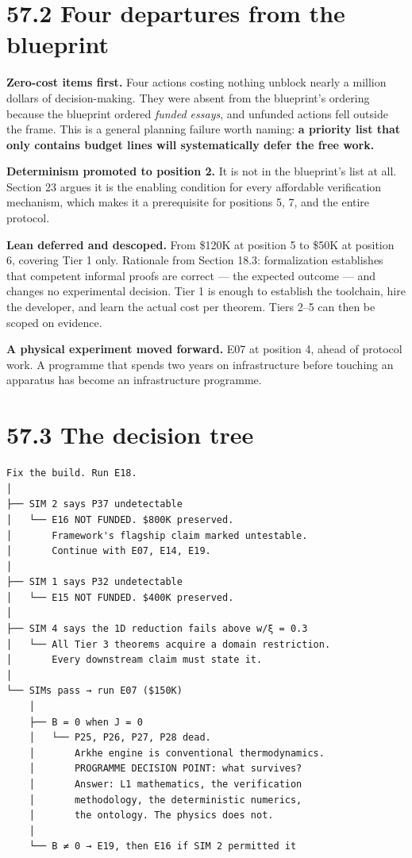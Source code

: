 \documentclass[
  11pt]{report}
\begin{document}
\hypertarget{four-departures-from-the-blueprint}{%
\section{57.2 Four departures from the
blueprint}\label{four-departures-from-the-blueprint}}

\textbf{Zero-cost items first.} Four actions costing nothing unblock
nearly a million dollars of decision-making. They were absent from the
blueprint's ordering because the blueprint ordered \emph{funded essays},
and unfunded actions fell outside the frame. This is a general planning
failure worth naming: \textbf{a priority list that only contains budget
lines will systematically defer the free work.}

\textbf{Determinism promoted to position 2.} It is not in the
blueprint's list at all. Section 23 argues it is the enabling condition
for every affordable verification mechanism, which makes it a
prerequisite for positions 5, 7, and the entire protocol.

\textbf{Lean deferred and descoped.} From \$120K at position 5 to \$50K
at position 6, covering Tier 1 only. Rationale from Section 18.3:
formalization establishes that competent informal proofs are correct ---
the expected outcome --- and changes no experimental decision. Tier 1 is
enough to establish the toolchain, hire the developer, and learn the
actual cost per theorem. Tiers 2--5 can then be scoped on evidence.

\textbf{A physical experiment moved forward.} E07 at position 4, ahead
of protocol work. A programme that spends two years on infrastructure
before touching an apparatus has become an infrastructure programme.

\hypertarget{the-decision-tree}{%
\section{57.3 The decision tree}\label{the-decision-tree}}

\begin{verbatim}
Fix the build. Run E18.
│
├── SIM 2 says P37 undetectable
│   └── E16 NOT FUNDED. $800K preserved.
│       Framework's flagship claim marked untestable.
│       Continue with E07, E14, E19.
│
├── SIM 1 says P32 undetectable
│   └── E15 NOT FUNDED. $400K preserved.
│
├── SIM 4 says the 1D reduction fails above w/ξ = 0.3
│   └── All Tier 3 theorems acquire a domain restriction.
│       Every downstream claim must state it.
│
└── SIMs pass → run E07 ($150K)
    │
    ├── B = 0 when J = 0
    │   └── P25, P26, P27, P28 dead.
    │       Arkhe engine is conventional thermodynamics.
    │       PROGRAMME DECISION POINT: what survives?
    │       Answer: L1 mathematics, the verification
    │       methodology, the deterministic numerics,
    │       the ontology. The physics does not.
    │
    └── B ≠ 0 → E19, then E16 if SIM 2 permitted it
\end{verbatim}
\end{document}
